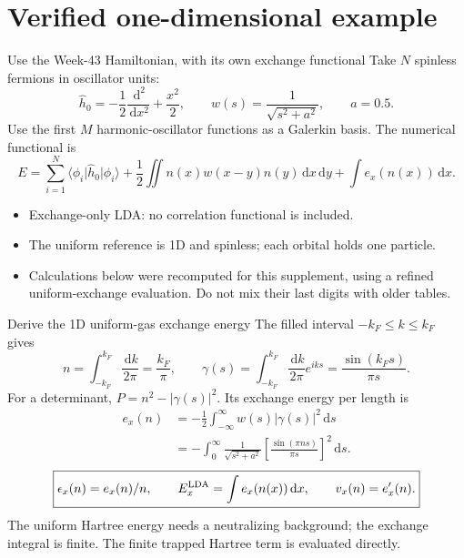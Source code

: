\documentclass[aspectratio=169,10pt]{beamer}
\newcommand{\dd}{\,\mathrm d}
\newcommand{\ket}[1]{\lvert #1\rangle}
\newcommand{\bra}[1]{\langle #1\rvert}
\begin{document}
\section{Verified one-dimensional example}
\begin{frame}{Use the Week-43 Hamiltonian, with its own exchange functional}
Take $N$ spinless fermions in oscillator units:
\[
 \hat h_0=-\frac12\frac{\dd^2}{\dd x^2}+\frac{x^2}{2},\qquad
 w(s)=\frac1{\sqrt{s^2+a^2}},\qquad a=0.5.
\]
Use the first $M$ harmonic-oscillator functions as a Galerkin basis.
The numerical functional is
\[
 E=\sum_{i=1}^{N}\bra{\phi_i}\hat h_0\ket{\phi_i}
        +\frac12\iint n(x)w(x-y)n(y)\dd x\dd y+\int e_x(n(x))\dd x.
\]
\begin{itemize}
\item Exchange-only LDA: no correlation functional is included.
\item The uniform reference is 1D and spinless; each orbital holds one particle.
\item Calculations below were recomputed for this supplement, using a refined
uniform-exchange evaluation. Do not mix their last digits with older tables.
\end{itemize}
\end{frame}

\begin{frame}{Derive the 1D uniform-gas exchange energy}
The filled interval $-k_F\leq k\leq k_F$ gives
\[
 n=\int_{-k_F}^{k_F}\frac{\dd k}{2\pi}=\frac{k_F}{\pi},\qquad
 \gamma(s)=\int_{-k_F}^{k_F}\frac{\dd k}{2\pi}e^{iks}
                         =\frac{\sin(k_Fs)}{\pi s}.
\]
For a determinant, $P=n^2-|\gamma(s)|^2$. Its exchange energy per length is
\begin{align*}
 e_x(n)&=-\frac12\int_{-\infty}^{\infty}w(s)|\gamma(s)|^2\dd s\\
       &=-\int_0^\infty\frac1{\sqrt{s^2+a^2}}
                         \left[\frac{\sin(\pi ns)}{\pi s}\right]^2\dd s.
\end{align*}
\[
 \boxed{\epsilon_x(n)=e_x(n)/n,\qquad E_x^{\rm LDA}=\int e_x(n(x))\dd x,
        \qquad v_x(n)=e_x'(n).}
\]
The uniform Hartree energy needs a neutralizing background; the exchange
integral is finite. The finite trapped Hartree term is evaluated directly.
\end{frame}
\end{document}

